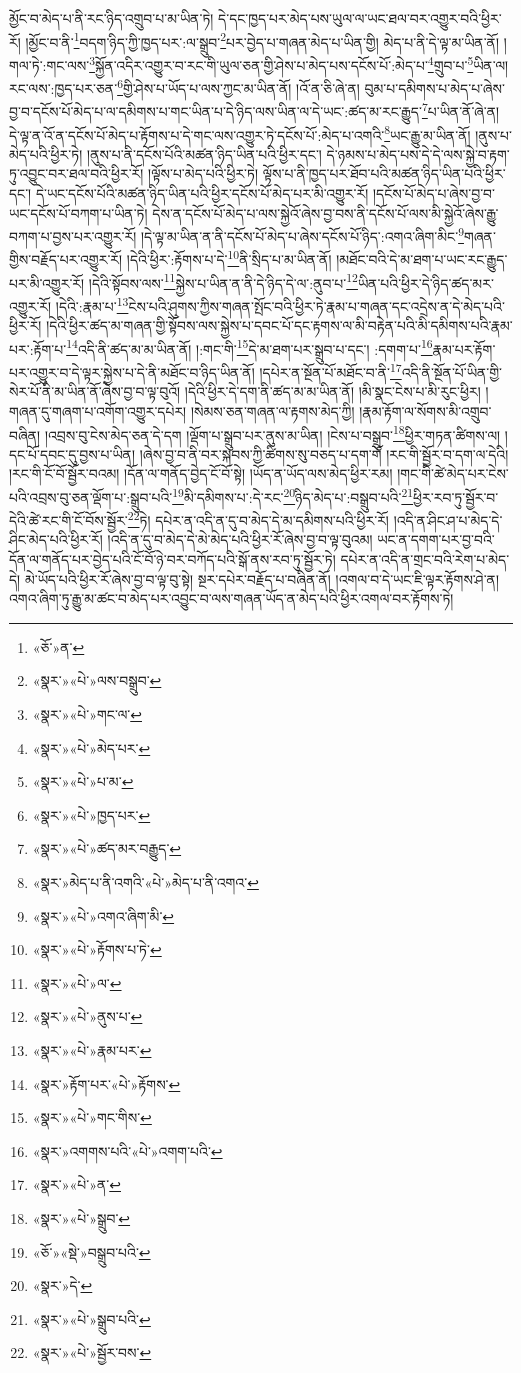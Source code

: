 མྱོང་བ་མེད་པ་ནི་རང་ཉིད་འགྲུབ་པ་མ་ཡིན་ཏེ། དེ་དང་ཁྱད་པར་མེད་པས་ཡུལ་ལ་ཡང་ཐལ་བར་འགྱུར་བའི་ཕྱིར་རོ། །མྱོང་བ་ནི་\footnote{«ཅོ་»ན་}བདག་ཉིད་ཀྱི་ཁྱད་པར་:ལ་སྒྲུབ་\footnote{«སྣར་»«པེ་»ལས་བསྒྲུབ་}པར་བྱེད་པ་གཞན་མེད་པ་ཡིན་གྱི། མེད་པ་ནི་དེ་ལྟ་མ་ཡིན་ནོ། །གལ་ཏེ་:གང་ལས་\footnote{«སྣར་»«པེ་»གང་ལ་}སྐྱོན་འདིར་འགྱུར་བ་རང་གི་ཡུལ་ཅན་གྱི་ཤེས་པ་མེད་པས་དངོས་པོ་:མེད་པ་\footnote{«སྣར་»«པེ་»མེད་པར་}གྲུབ་པ་\footnote{«སྣར་»«པེ་»པ་མ་}ཡིན་ལ། རང་ལས་:ཁྱད་པར་ཅན་\footnote{«སྣར་»«པེ་»ཁྱད་པར་}གྱི་ཤེས་པ་ཡོད་པ་ལས་ཀྱང་མ་ཡིན་ནོ། །འོ་ན་ཅི་ཞེ་ན། བུམ་པ་དམིགས་པ་མེད་པ་ཞེས་བྱ་བ་དངོས་པོ་མེད་པ་ལ་དམིགས་པ་གང་ཡིན་པ་དེ་ཉིད་ལས་ཡིན་ལ་དེ་ཡང་:ཚད་མ་རང་རྒྱུད་\footnote{«སྣར་»«པེ་»ཚད་མར་བརྒྱུད་}པ་ཡིན་ནོ་ཞེ་ན། དེ་ལྟ་ན་འོ་ན་དངོས་པོ་མེད་པ་རྟོགས་པ་དེ་གང་ལས་འགྱུར་ཏེ་དངོས་པོ་:མེད་པ་འགའི་\footnote{«སྣར་»མེད་པ་ནི་འགའི་«པེ་»མེད་པ་ནི་འགའ་}ཡང་རྒྱུ་མ་ཡིན་ནོ། །ནུས་པ་མེད་པའི་ཕྱིར་ཏེ། །ནུས་པ་ནི་དངོས་པོའི་མཚན་ཉིད་ཡིན་པའི་ཕྱིར་དང་། དེ་ཉམས་པ་མེད་པས་དེ་དེ་ལས་སྐྱེ་བ་རྟག་ཏུ་འབྱུང་བར་ཐལ་བའི་ཕྱིར་རོ། །ལྟོས་པ་མེད་པའི་ཕྱིར་ཏེ། ལྟོས་པ་ནི་ཁྱད་པར་ཐོབ་པའི་མཚན་ཉིད་ཡིན་པའི་ཕྱིར་དང་། དེ་ཡང་དངོས་པོའི་མཚན་ཉིད་ཡིན་པའི་ཕྱིར་དངོས་པོ་མེད་པར་མི་འགྱུར་རོ། །དངོས་པོ་མེད་པ་ཞེས་བྱ་བ་ཡང་དངོས་པོ་བཀག་པ་ཡིན་ཏེ། དེས་ན་དངོས་པོ་མེད་པ་ལས་སྐྱེའོ་ཞེས་བྱ་བས་ནི་དངོས་པོ་ལས་མི་སྐྱེའོ་ཞེས་རྒྱུ་བཀག་པ་བྱས་པར་འགྱུར་རོ། །དེ་ལྟ་མ་ཡིན་ན་ནི་དངོས་པོ་མེད་པ་ཞེས་དངོས་པོ་ཉིད་:འགའ་ཞིག་མིང་\footnote{«སྣར་»«པེ་»འགའ་ཞིག་མི་}གཞན་གྱིས་བརྗོད་པར་འགྱུར་རོ། །དེའི་ཕྱིར་:རྟོགས་པ་དེ་\footnote{«སྣར་»«པེ་»རྟོགས་པ་ཏེ་}ནི་སྲིད་པ་མ་ཡིན་ནོ། །མཐོང་བའི་དེ་མ་ཐག་པ་ཡང་རང་རྒྱུད་པར་མི་འགྱུར་རོ། །དེའི་སྟོབས་ལས་\footnote{«སྣར་»«པེ་»ལ་}སྐྱེས་པ་ཡིན་ན་ནི་དེ་ཉིད་དེ་ལ་:ནུབ་པ་\footnote{«སྣར་»«པེ་»ནུས་པ་}ཡིན་པའི་ཕྱིར་དེ་ཉིད་ཚད་མར་འགྱུར་རོ། །དེའི་:རྣམ་པ་\footnote{«སྣར་»«པེ་»རྣམ་པར་}ངེས་པའི་ཤུགས་ཀྱིས་གཞན་སྤོང་བའི་ཕྱིར་ཏེ་རྣམ་པ་གཞན་དང་འདྲེས་ན་དེ་མེད་པའི་ཕྱིར་རོ། །དེའི་ཕྱིར་ཚད་མ་གཞན་གྱི་སྟོབས་ལས་སྐྱེས་པ་དབང་པོ་དང་རྟགས་ལ་མི་བརྟེན་པའི་མི་དམིགས་པའི་རྣམ་པར་:རྟོག་པ་\footnote{«སྣར་»རྟོག་པར་«པེ་»རྟོགས་}འདི་ནི་ཚད་མ་མ་ཡིན་ནོ། །:གང་གི་\footnote{«སྣར་»«པེ་»གང་གིས་}དེ་མ་ཐག་པར་སྒྲུབ་པ་དང་། :དགག་པ་\footnote{«སྣར་»འགགས་པའི་«པེ་»འགག་པའི་}རྣམ་པར་རྟོག་པར་འགྱུར་བ་དེ་ལྟར་སྐྱེས་པ་དེ་ནི་མཐོང་བ་ཉིད་ཡིན་ནོ། །དཔེར་ན་སྔོན་པོ་མཐོང་བ་ནི་\footnote{«སྣར་»«པེ་»ན་}འདི་ནི་སྔོན་པོ་ཡིན་གྱི་སེར་པོ་ནི་མ་ཡིན་ནོ་ཞེས་བྱ་བ་ལྟ་བུའོ། །དེའི་ཕྱིར་དེ་དག་ནི་ཚད་མ་མ་ཡིན་ནོ། །མི་སྣང་ངེས་པ་མི་རུང་ཕྱིར། །གཞན་དུ་གཞག་པ་འགོག་འགྱུར་དཔེར། །སེམས་ཅན་གཞན་ལ་རྟགས་མེད་ཀྱི། །རྣམ་རྟོག་ལ་སོགས་མི་འགྲུབ་བཞིན། །འབྲས་བུ་ངེས་མེད་ཅན་དེ་དག །ལྡོག་པ་སྒྲུབ་པར་ནུས་མ་ཡིན། །ངེས་པ་བསྒྲུབ་\footnote{«སྣར་»«པེ་»སྒྲུབ་}ཕྱིར་གཏན་ཚིགས་ལ། །དང་པོ་དབང་དུ་བྱས་པ་ཡིན། །ཞེས་བྱ་བ་ནི་བར་སྐབས་ཀྱི་ཚིགས་སུ་བཅད་པ་དག་གོ །རང་གི་སྦྱོར་བ་དག་ལ་དེའི། །རང་གི་ངོ་བོ་སྦྱོར་བའམ། །དོན་ལ་གནོད་བྱེད་ངོ་བོ་སྟེ། །ཡོད་ན་ཡོད་ལས་མེད་ཕྱིར་རམ། །གང་གི་ཚེ་མེད་པར་ངེས་པའི་འབྲས་བུ་ཅན་ལྡོག་པ་:སྒྲུབ་པའི་\footnote{«ཅོ་»«སྡེ་»བསྒྲུབ་པའི་}མི་དམིགས་པ་:དེ་རང་\footnote{«སྣར་»དེ་}ཉིད་མེད་པ་:བསྒྲུབ་པའི་\footnote{«སྣར་»«པེ་»སྒྲུབ་པའི་}ཕྱིར་རབ་ཏུ་སྦྱོར་བ་དེའི་ཚེ་རང་གི་ངོ་བོས་སྦྱོར་\footnote{«སྣར་»«པེ་»སྦྱོར་བས་}ཏེ། དཔེར་ན་འདི་ན་དུ་བ་མེད་དེ་མ་དམིགས་པའི་ཕྱིར་རོ། །འདི་ན་ཤིང་ཤ་པ་མེད་དེ་ཤིང་མེད་པའི་ཕྱིར་རོ། །འདི་ན་དུ་བ་མེད་དེ་མེ་མེད་པའི་ཕྱིར་རོ་ཞེས་བྱ་བ་ལྟ་བུའམ། ཡང་ན་དགག་པར་བྱ་བའི་དོན་ལ་གནོད་པར་བྱེད་པའི་ངོ་བོ་ཉེ་བར་བཀོད་པའི་སྒོ་ནས་རབ་ཏུ་སྦྱོར་ཏེ། དཔེར་ན་འདི་ན་གྲང་བའི་རེག་པ་མེད་དེ། མེ་ཡོད་པའི་ཕྱིར་རོ་ཞེས་བྱ་བ་ལྟ་བུ་སྟེ། སྔར་དཔེར་བརྗོད་པ་བཞིན་ནོ། །འགལ་བ་དེ་ཡང་ཇི་ལྟར་རྟོགས་ཤེ་ན། འགའ་ཞིག་ཏུ་རྒྱུ་མ་ཚང་བ་མེད་པར་འབྱུང་བ་ལས་གཞན་ཡོད་ན་མེད་པའི་ཕྱིར་འགལ་བར་རྟོགས་ཏེ། 